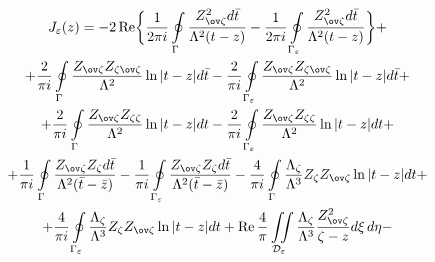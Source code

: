 \begin{multline} 


\allowdisplaybreaks[4]


J_\varepsilon(z)=-2\re\biggl\{\frac{1}{2\pi i}\ointl_\Gamma 


\frac{Z^2_{\ov\zeta}d\Bar t}{\Lambda^2(t-z)}-\frac{1}{2\pi i} 


\ointl_{\Gamma_\varepsilon} 


\frac{Z^2_{\ov\zeta}d\Bar t}{\Lambda^2(t-z)}\biggr\}+\\ 


% 


+\frac{2}{\pi i}\ointl_\Gamma 


\frac{Z_{\ov\zeta}Z_{\zeta\ov\zeta}}{\Lambda^2}\ln|t-z|d\Bar t 


-\frac{2}{\pi i}\ointl_{\Gamma_\varepsilon} 


\frac{Z_{\ov\zeta}Z_{\zeta\ov\zeta}}{\Lambda^2}\ln|t-z|d\Bar t+\\ 


% 


+\frac{2}{\pi i}\ointl_\Gamma 


\frac{Z_{\ov\zeta}Z_{\zeta\zeta}}{\Lambda^2}\ln|t-z|dt- 


\frac{2}{\pi i}\ointl_{\Gamma_\varepsilon} 


\frac{Z_{\ov\zeta}Z_{\zeta\zeta}}{\Lambda^2}\ln|t-z|dt+\\ 


% 


+\frac{1}{\pi i}\ointl_\Gamma 


\frac{Z_{\ov\zeta}Z_{\zeta}d\Bar t}{\Lambda^2(\Bar t-\Bar z)} 


-\frac{1}{\pi i}\ointl_{\Gamma_\varepsilon} 


\frac{Z_{\ov\zeta}Z_{\zeta}d\bar t}{\Lambda^2(\Bar t-\Bar z)} 


-\frac{4}{\pi i}\ointl_\Gamma 


\frac{\Lambda_\zeta}{\Lambda^3}Z_\zeta Z_{\ov\zeta}\ln|t-z|dt+\\ 


% 


+ 


\frac{4}{\pi i}\ointl_{\Gamma_\varepsilon}\frac{\Lambda_\zeta}{\Lambda^3} 


Z_\zeta Z_{\ov\zeta}\ln|t-z|dt+\re\frac{4}{\pi} 


\iintl_{\cal D_\varepsilon}\frac{\Lambda_\zeta}{\Lambda^3} 


\frac{Z^2_{\ov\zeta}}{\zeta-z}d\xi\,d\eta- 



\end{multline}
